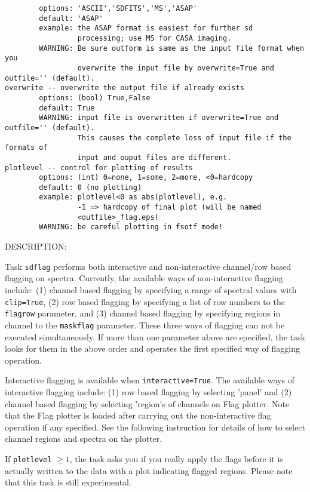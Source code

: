 \begin{verbatim}
        options: 'ASCII','SDFITS','MS','ASAP'
        default: 'ASAP'
        example: the ASAP format is easiest for further sd
                 processing; use MS for CASA imaging.
        WARNING: Be sure outform is same as the input file format when you 
                 overwrite the input file by overwrite=True and outfile='' (default).
overwrite -- overwrite the output file if already exists
        options: (bool) True,False
        default: True
        WARNING: input file is overwritten if overwrite=True and outfile='' (default). 
                 This causes the complete loss of input file if the formats of
                 input and ouput files are different.
plotlevel -- control for plotting of results
        options: (int) 0=none, 1=some, 2=more, <0=hardcopy
        default: 0 (no plotting)
        example: plotlevel<0 as abs(plotlevel), e.g.
                 -1 => hardcopy of final plot (will be named
                 <outfile>_flag.eps)
        WARNING: be careful plotting in fsotf mode!

\end{verbatim}


DESCRIPTION:

Task {\tt sdflag} performs both interactive and non-interactive channel/row 
based flagging on spectra.
Currently, the available ways of non-interactive flagging include: 
(1) channel based flagging by specifying a range of spectral values 
with {\tt clip=True}, (2) row based flagging by specifying a list of row 
numbers to the {\tt flagrow} parameter, and (3) channel based flagging by 
specifying regions in channel to the {\tt maskflag} parameter. 
These three ways of flagging can not be executed simultaneously. 
If more than one parameter above are specified, the task looks for 
them in the above order and operates the first specified way of 
flagging operation.

Interactive flagging is available when {\tt interactive=True}. 
The available ways of interactive flagging include: 
(1) row based flagging by selecting 'panel' and (2) channel
based flagging by selecting 'region's of channels on Flag plotter. 
Note that the Flag plotter is loaded after carrying out the 
non-interactive flag operation if any specified. See the following instruction for
details of how to select channel regions and spectra on the plotter.

If {\tt plotlevel} $ \ge 1 $, the task asks you if you really apply the 
flags before it is actually written to the data with a plot 
indicating flagged regions.
Please note that this task is still experimental.


